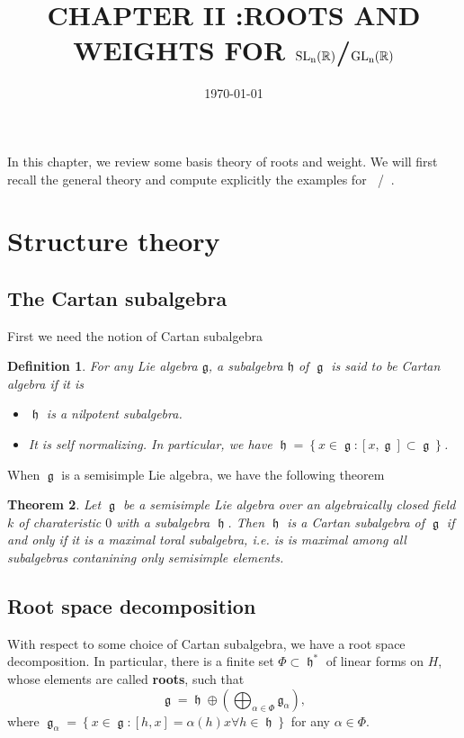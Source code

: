 \documentclass[12pt]{article} %
\title{CHAPTER II :ROOTS AND WEIGHTS FOR $\SLn$/$\GLn$} %
\date{\today} %
\newtheorem{definition}{Definition}[section]
\newtheorem{theorem}[definition]{Theorem}
\DeclareMathOperator{\SLn}{\text{SL}_n(\mathbb{R})}
\DeclareMathOperator{\GLn}{\text{GL}_n(\mathbb{R})}
\DeclareMathOperator{\fg}{\mathfrak{g}}
\DeclareMathOperator{\fh}{\mathfrak{h}}
\begin{document}
\maketitle
In this chapter, we review some basis theory of roots and weight. We will first recall the
general theory and compute explicitly the examples for $\SLn$/$\GLn$.
\section{Structure theory}
\subsection{The Cartan subalgebra}
First we need the notion of Cartan subalgebra
\begin{definition}
    For any Lie algebra $\mathfrak{g}$, a subalgebra $\mathfrak{h}$ of $\fg$ is said to be \textit{Cartan algebra} if it is
    \begin{itemize}
        \item $\fh$ is a nilpotent subalgebra.
        \item It is self normalizing. In particular, we have $\fh = \left\lbrace x \in \fg : [x,\fg] \subset \fg\right\rbrace$.
    \end{itemize}
\end{definition}
When $\fg$ is a semisimple Lie algebra, we have the following theorem
\begin{theorem}
    Let $\fg$ be a semisimple Lie algebra over an algebraically closed field $k$ of charateristic $0$ with a subalgebra $\fh$.
    Then $\fh$ is a Cartan subalgebra of $\fg$ if and only if it is a maximal toral subalgebra, i.e. is is maximal among all subalgebras
    contanining only semisimple elements.
\end{theorem}
\subsection{Root space decomposition}
With respect to some choice of Cartan subalgebra, we have a root space decomposition. In particular, there is a finite set
$\Phi \subset \fh^{*}$ of linear forms on $H$, whose elements are called \textbf{roots}, such that
\[\fg = \fh \oplus \left(\bigoplus_{\alpha \in \Phi} \mathfrak{g}_\alpha\right),\]
where $\fg_\alpha = \left\lbrace x \in \fg: [h,x] = \alpha(h)x \forall h \in \fh\right\rbrace$ for any $\alpha \in \Phi$.
\end{document}
